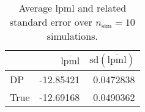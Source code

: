 \begin{table}[H]

\caption{Average lpml and related standard error over $n_{\text{sim}} = 10$ simulations.}
\centering
\begin{tabular}[t]{lrr}
\toprule
  & $\overbar{\text{lpml}}$ & $\text{sd}(\overbar{\text{lpml}})$\\
\midrule
DP & -12.85421 & 0.0472838\\
True & -12.69168 & 0.0490362\\
\bottomrule
\end{tabular}
\end{table}